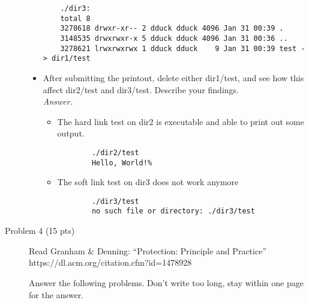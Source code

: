 \documentclass[11pt]{article}
\begin{document}
\begin{description}
\begin{itemize}
\begin{verbatim}
	./dir3:
	total 8
	3278618 drwxr-xr-- 2 dduck dduck 4096 Jan 31 00:39 .
	3148535 drwxrwxr-x 5 dduck dduck 4096 Jan 31 00:36 ..
	3278621 lrwxrwxrwx 1 dduck dduck    9 Jan 31 00:39 test -> dir1/test
\end{verbatim}
 \item
After submitting the printout, delete either dir1/test, and see how this affect dir2/test and dir3/test.  Describe your findings. 
\\\textit{Answer.}
\begin{itemize}
	\item The hard link test on dir2 is executable and able to print out some output.
	\begin{verbatim}
		./dir2/test 
		Hello, World!%
	\end{verbatim}
	\item The soft link test on dir3 does not work anymore
	\begin{verbatim}
		./dir3/test
		no such file or directory: ./dir3/test
	\end{verbatim}
\end{itemize}
\end{itemize}

 \item[Problem 4 (15 pts) ]
Read Granham \& Denning: ``Protection: Principle and Practice''\\
https://dl.acm.org/citation.cfm?id=1478928

\noindent Answer the following problems.  Don't write too long, stay within one page for the answer.


\end{description}
\end{document}
